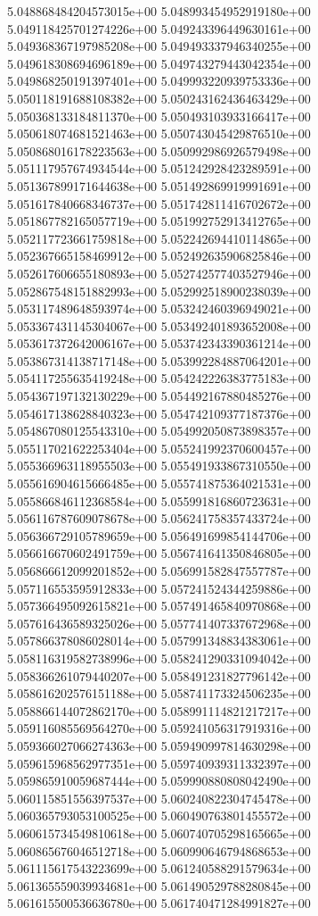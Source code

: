 5.048868484204573015e+00
5.048993454952919180e+00
5.049118425701274226e+00
5.049243396449630161e+00
5.049368367197985208e+00
5.049493337946340255e+00
5.049618308694696189e+00
5.049743279443042354e+00
5.049868250191397401e+00
5.049993220939753336e+00
5.050118191688108382e+00
5.050243162436463429e+00
5.050368133184811370e+00
5.050493103933166417e+00
5.050618074681521463e+00
5.050743045429876510e+00
5.050868016178223563e+00
5.050992986926579498e+00
5.051117957674934544e+00
5.051242928423289591e+00
5.051367899171644638e+00
5.051492869919991691e+00
5.051617840668346737e+00
5.051742811416702672e+00
5.051867782165057719e+00
5.051992752913412765e+00
5.052117723661759818e+00
5.052242694410114865e+00
5.052367665158469912e+00
5.052492635906825846e+00
5.052617606655180893e+00
5.052742577403527946e+00
5.052867548151882993e+00
5.052992518900238039e+00
5.053117489648593974e+00
5.053242460396949021e+00
5.053367431145304067e+00
5.053492401893652008e+00
5.053617372642006167e+00
5.053742343390361214e+00
5.053867314138717148e+00
5.053992284887064201e+00
5.054117255635419248e+00
5.054242226383775183e+00
5.054367197132130229e+00
5.054492167880485276e+00
5.054617138628840323e+00
5.054742109377187376e+00
5.054867080125543310e+00
5.054992050873898357e+00
5.055117021622253404e+00
5.055241992370600457e+00
5.055366963118955503e+00
5.055491933867310550e+00
5.055616904615666485e+00
5.055741875364021531e+00
5.055866846112368584e+00
5.055991816860723631e+00
5.056116787609078678e+00
5.056241758357433724e+00
5.056366729105789659e+00
5.056491699854144706e+00
5.056616670602491759e+00
5.056741641350846805e+00
5.056866612099201852e+00
5.056991582847557787e+00
5.057116553595912833e+00
5.057241524344259886e+00
5.057366495092615821e+00
5.057491465840970868e+00
5.057616436589325026e+00
5.057741407337672968e+00
5.057866378086028014e+00
5.057991348834383061e+00
5.058116319582738996e+00
5.058241290331094042e+00
5.058366261079440207e+00
5.058491231827796142e+00
5.058616202576151188e+00
5.058741173324506235e+00
5.058866144072862170e+00
5.058991114821217217e+00
5.059116085569564270e+00
5.059241056317919316e+00
5.059366027066274363e+00
5.059490997814630298e+00
5.059615968562977351e+00
5.059740939311332397e+00
5.059865910059687444e+00
5.059990880808042490e+00
5.060115851556397537e+00
5.060240822304745478e+00
5.060365793053100525e+00
5.060490763801455572e+00
5.060615734549810618e+00
5.060740705298165665e+00
5.060865676046512718e+00
5.060990646794868653e+00
5.061115617543223699e+00
5.061240588291579634e+00
5.061365559039934681e+00
5.061490529788280845e+00
5.061615500536636780e+00
5.061740471284991827e+00
